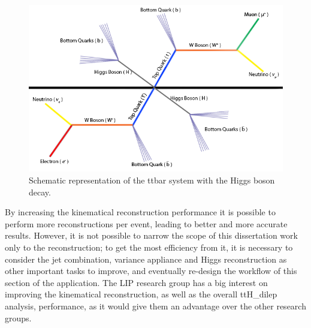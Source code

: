\begin{figure}[!htp]
	\begin{center}
		\includegraphics[scale=0.5]{../../common/img/ttbar_higgs.png}
		\caption{Schematic representation of the ttbar system with the Higgs boson decay.}
		\label{fig:ttbarhiggs}
	\end{center}
\end{figure}

By increasing the kinematical reconstruction performance it is possible to perform more reconstructions per event, leading to better and more accurate results. However, it is not possible to narrow the scope of this dissertation work only to the reconstruction; to get the most efficiency from it, it is necessary to consider the jet combination, variance appliance and Higgs reconstruction as other important tasks to improve, and eventually re-design the workflow of this section of the application. The LIP research group has a big interest on improving the kinematical reconstruction, as well as the overall ttH\_dilep analysis, performance, as it would give them an advantage over the other research groups.

\newpage
